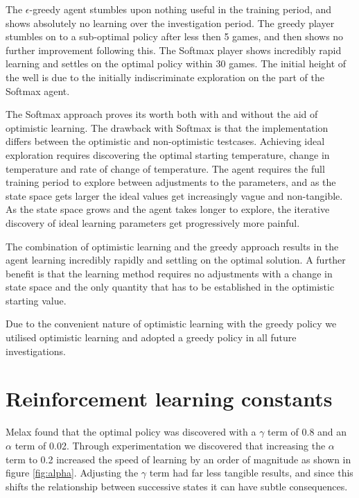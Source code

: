 \documentclass{rucsthesis}
\begin{document}
The $\epsilon$-greedy agent stumbles upon nothing useful in the training period, and shows absolutely no learning over the investigation period. The greedy player stumbles on to a sub-optimal policy after less then 5 games, and then shows no further improvement following this. The Softmax player shows incredibly rapid learning and settles on the optimal policy within 30 games. The initial height of the well is due to the initially indiscriminate exploration on the part of the Softmax agent.

The Softmax approach proves its worth both with and without the aid of optimistic learning. The drawback with Softmax is that the implementation differs between the optimistic and non-optimistic testcases. Achieving ideal exploration requires discovering the optimal starting temperature, change in temperature and rate of change of temperature. The agent requires the full training period to explore between adjustments to the parameters, and as the state space gets larger the ideal values get increasingly vague and non-tangible. As the state space grows and the agent takes longer to explore, the iterative discovery of ideal learning parameters get progressively more painful.

The combination of optimistic learning and the greedy approach results in the agent learning incredibly rapidly and settling on the optimal solution. A further benefit is that the learning method requires no adjustments with a change in state space and the only quantity that has to be established in the optimistic starting value.

Due to the convenient nature of optimistic learning with the greedy policy we utilised optimistic learning and adopted a greedy policy in all future investigations.

\section{Reinforcement learning constants}

Melax found that the optimal policy was discovered with a $\gamma$ term of 0.8 and an $\alpha$ term of 0.02. Through experimentation we discovered that increasing the $\alpha$ term to 0.2 increased the speed of learning by an order of magnitude as shown in figure \ref{fig:alpha}. Adjusting the $\gamma$ term had far less tangible results, and since this shifts the relationship between successive states it can have subtle consequences.
\end{document}
